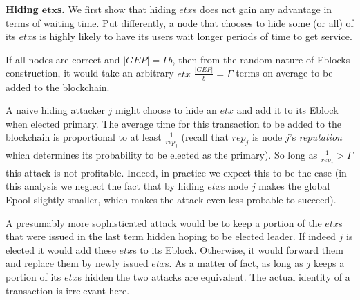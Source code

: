 \textbf{Hiding $\pmb{etx}$s.}
We first show that hiding $etx$s does not gain any advantage in terms of waiting time. Put differently, a node that chooses to hide some (or all) of its $etx$s is highly likely to have its users wait longer periods of time to get service. 

If all nodes are correct and $|GEP|=\Gamma b$, then from the random nature of Eblocks construction, it would take an arbitrary $etx$ $\frac{|GEP|}{b}=\Gamma$ terms on average to be added to the blockchain.

A naive hiding attacker $j$ might choose to hide an $etx$ and add it to its Eblock when elected primary. The average time for this transaction to be added to the blockchain is proportional to at least $\frac{1}{rep_j}$ (recall that $rep_j$ is node $j$'s \textit{reputation} which determines its probability to be elected as the primary). So long as $\frac{1}{rep_j} > \Gamma$ this attack is not profitable. Indeed, in practice we expect this to be the case (in this analysis we neglect the fact that by hiding $etx$s node $j$ makes the global Epool slightly smaller, which makes the attack even less probable to succeed).


A presumably more sophisticated attack would be to keep a portion of the $etx$s that were issued in the last term hidden hoping to be elected leader. If indeed $j$ is elected it would add these $etx$s to its Eblock. Otherwise, it would forward them and replace them by newly issued $etx$s. As a matter of fact, as long as $j$ keeps a portion of its $etx$s hidden the two attacks are equivalent. The actual identity of a transaction is irrelevant here.

